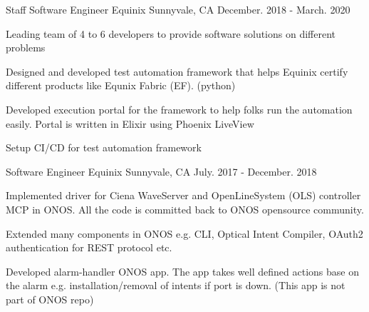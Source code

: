 \begin{cventries}
  \cventry
    {Staff Software Engineer} %
    {Equinix} %
    {Sunnyvale, CA} %
    {December. 2018 - March. 2020} %
    {
      \begin{cvitems} %
        \item {Leading team of 4 to 6 developers to provide software solutions on different problems}
        \item {Designed and developed test automation framework that helps Equinix certify different
               products like Equnix Fabric (EF). (python)}
        \item {Developed execution portal for the framework to help folks run the automation easily. Portal is written in Elixir using Phoenix LiveView}
        \item {Setup CI/CD for test automation framework}
      \end{cvitems}
    }

  \cventry
    {Software Engineer} %
    {Equinix} %
    {Sunnyvale, CA} %
    {July. 2017 - December. 2018} %
    {
      \begin{cvitems} %
        \item {Implemented driver for Ciena WaveServer and OpenLineSystem (OLS) controller MCP in ONOS.
               All the code is committed back to ONOS opensource community.}
        \item {Extended many components in ONOS e.g. CLI, Optical Intent Compiler, OAuth2
               authentication for REST protocol etc.}
        \item {Developed alarm-handler ONOS app. The app takes well defined
               actions base on the alarm e.g. installation/removal of intents if port is down.
               (This app is not part of ONOS repo)}
      \end{cvitems}
    }


\end{cventries}
